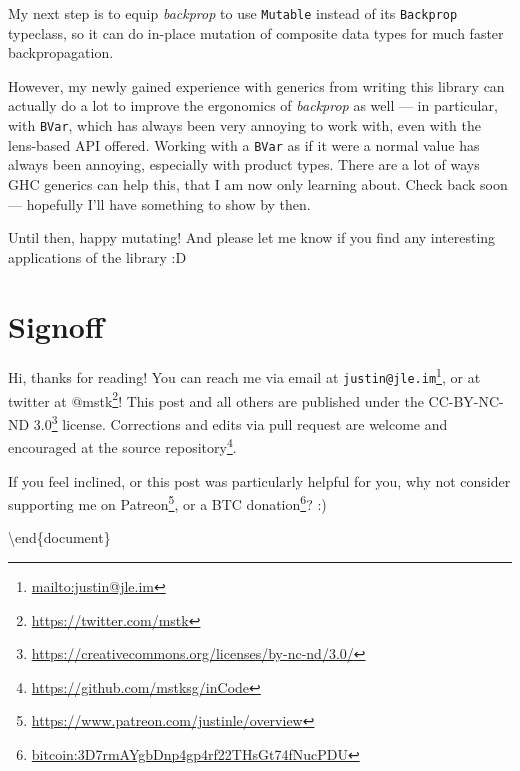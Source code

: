 \documentclass[]{article}
\renewcommand{\href}[2]{#2\footnote{\url{#1}}}
\begin{document}
My next step is to equip \emph{backprop} to use \texttt{Mutable} instead of its
\texttt{Backprop} typeclass, so it can do in-place mutation of composite data
types for much faster backpropagation.

However, my newly gained experience with generics from writing this library can
actually do a lot to improve the ergonomics of \emph{backprop} as well --- in
particular, with \texttt{BVar}, which has always been very annoying to work
with, even with the lens-based API offered. Working with a \texttt{BVar} as if
it were a normal value has always been annoying, especially with product types.
There are a lot of ways GHC generics can help this, that I am now only learning
about. Check back soon --- hopefully I'll have something to show by then.

Until then, happy mutating! And please let me know if you find any interesting
applications of the library :D

\section{Signoff}\label{signoff}

Hi, thanks for reading! You can reach me via email at
\href{mailto:justin@jle.im}{\nolinkurl{justin@jle.im}}, or at twitter at
\href{https://twitter.com/mstk}{@mstk}! This post and all others are published
under the \href{https://creativecommons.org/licenses/by-nc-nd/3.0/}{CC-BY-NC-ND
3.0} license. Corrections and edits via pull request are welcome and encouraged
at \href{https://github.com/mstksg/inCode}{the source repository}.

If you feel inclined, or this post was particularly helpful for you, why not
consider \href{https://www.patreon.com/justinle/overview}{supporting me on
Patreon}, or a \href{bitcoin:3D7rmAYgbDnp4gp4rf22THsGt74fNucPDU}{BTC donation}?
:)

\textbackslash end\{document\}
\end{document}

